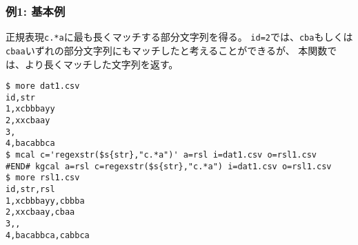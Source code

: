 \subsubsection*{例1: 基本例}

正規表現\verb|c.*a|に最も長くマッチする部分文字列を得る。
\verb|id=2|では、\verb|cba|もしくは\verb|cbaa|いずれの部分文字列にもマッチしたと考えることができるが、
本関数では、より長くマッチした文字列を返す。


\begin{Verbatim}[baselinestretch=0.7,frame=single]
$ more dat1.csv
id,str
1,xcbbbayy
2,xxcbaay
3,
4,bacabbca
$ mcal c='regexstr($s{str},"c.*a")' a=rsl i=dat1.csv o=rsl1.csv
#END# kgcal a=rsl c=regexstr($s{str},"c.*a") i=dat1.csv o=rsl1.csv
$ more rsl1.csv
id,str,rsl
1,xcbbbayy,cbbba
2,xxcbaay,cbaa
3,,
4,bacabbca,cabbca
\end{Verbatim}
